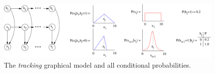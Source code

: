 \documentclass[letterpaper]{article}
\begin{document}
\begin{figure}[t!]
\begin{center}
\vspace{-1mm}
\includegraphics[width=.7\textwidth]{gm3.pdf}
\end{center}
\vspace{-5mm}
\caption{\footnotesize The \emph{tracking} graphical model and all conditional probabilities.} \label{fig:gm3}
\end{figure}
\end{document}
